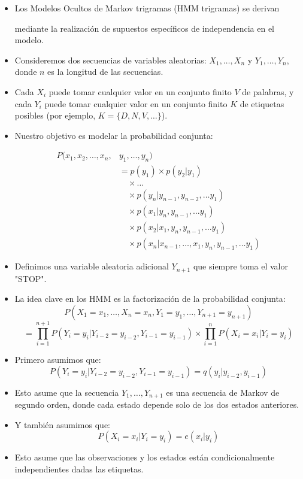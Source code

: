 \begin{itemize}
  \item Los Modelos Ocultos de Markov trigramas (HMM trigramas) se derivan

mediante la realización de supuestos específicos de independencia en el modelo.

  \item Consideremos dos secuencias de variables aleatorias: $X_1, \ldots, X_n$ y $Y_1, \ldots, Y_n$, donde $n$ es la longitud de las secuencias.

  \item Cada $X_i$ puede tomar cualquier valor en un conjunto finito $V$ de palabras, y cada $Y_i$ puede tomar cualquier valor en un conjunto finito $K$ de etiquetas posibles (por ejemplo, $K=\{D,N,V, \ldots \}$).

  \item Nuestro objetivo es modelar la probabilidad conjunta:

  \begin{align*}
    P(x_1,x_2,\dots,x_n,&y_1,\dots,y_n) \\
    &= p(y_1) \times p(y_2|y_1) \\
    &\quad \times \dots \\
    &\quad \times p(y_n|y_{n-1},y_{n-2},\dots y_1) \\
    &\quad \times p(x_1|y_{n},y_{n-1},\dots y_1) \\
    &\quad \times p(x_2|x_1,y_{n},y_{n-1},\dots y_1) \\
    &\quad \times p(x_n|x_{n-1},\dots,x_1,y_{n},y_{n-1},\dots y_1)
  \end{align*}

  \item Definimos una variable aleatoria adicional $Y_{n+1}$ que siempre toma el valor "STOP".

  \item La idea clave en los HMM es la factorización de la probabilidad conjunta:
  \[P(X_1 = x_1, \ldots, X_n = x_n, Y_1 = y_1, \ldots, Y_{n+1} = y_{n+1})\]
  \[= \prod_{i=1}^{n+1} P(Y_i = y_i | Y_{i-2} = y_{i-2}, Y_{i-1} = y_{i-1}) \times \prod_{i=1}^{n} P(X_i = x_i | Y_i = y_i)\]

  \item Primero asumimos que:
  \[P(Y_i = y_i | Y_{i-2} = y_{i-2}, Y_{i-1} = y_{i-1}) = q(y_i | y_{i-2}, y_{i-1})\]

  \item Esto asume que la secuencia $Y_1, \ldots, Y_{n+1}$ es una secuencia de Markov de segundo orden, donde cada estado depende solo de los dos estados anteriores.

  \item Y también asumimos que:
    \[P(X_i = x_i | Y_i = y_i) = e(x_i | y_i)\]

  \item Esto asume que las observaciones y los estados están condicionalmente independientes dadas las etiquetas.

\end{itemize}


